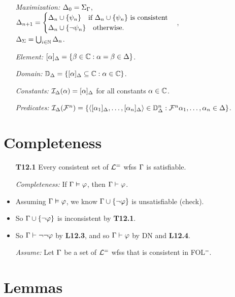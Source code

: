 \documentclass[a4paper, 11pt]{article} %
\begin{document}
\begin{itemize}
  \item[\it Maximization:]
    $\Delta_0 = \Sigma_{\Gamma}$,\\ 
    $\Delta_{n+1} =
      \begin{cases}
        \Delta_n\cup\lbrace\psi_n\rbrace ~~\text{ if } \Delta_n\cup\lbrace\psi_n\rbrace \text{ is consistent}\\
        \Delta_n\cup\lbrace\neg\psi_n\rbrace ~~\text{ otherwise}.
      \end{cases}$,\\
    $\Delta_{\Sigma} = \bigcup_{i\in\mathbb{N}}\Delta_n$. 
  \item[\it Element:] $[\alpha]_{\Delta}=\lbrace\beta\in\mathbb{C} : \alpha=\beta\in\Delta\rbrace$.
  \item[\it Domain:] $\mathbb{D}_{\Delta}=\lbrace[\alpha]_{\Delta} \subseteq \mathbb{C} : \alpha\in\mathbb{C}\rbrace$.
  \item[\it Constants:] $\mathcal{I}_{\Delta}(\alpha)=[\alpha]_{\Delta}$ for all constants $\alpha\in\mathbb{C}$.
  \item[\it Predicates:] $\mathcal{I}_{\Delta}(\mathcal{F}^n)=\lbrace\langle[\alpha_1]_{\Delta},\ldots,[\alpha_n]_{\Delta}\rangle\in\mathbb{D}_{\Delta}^n:\mathcal{F}^n\alpha_1,\ldots,\alpha_n\in\Delta\rbrace$.
\end{itemize}




\section*{Completeness}

\begin{itemize}
  \item[\bf T12.1] Every consistent set of $\mathcal{L}^=$ wfss $\Gamma$ is satisfiable.
  \item[\it Completeness:] If $\Gamma\vDash\varphi$, then $\Gamma\vdash\varphi$.
  \item Assuming $\Gamma\vDash\varphi$, we know $\Gamma\cup\lbrace\neg\varphi\rbrace$ is unsatisfiable (check).
  \item So $\Gamma\cup\lbrace\neg\varphi\rbrace$ is inconsistent by \textbf{T12.1}.
  \item So $\Gamma\vdash\neg\neg\varphi$ by \textbf{L12.3}, and so $\Gamma\vdash\varphi$ by DN and \textbf{L12.4}.
  \item[\it Assume:] Let $\Gamma$ be a set of $\mathcal{L}^=$ wfss that is consistent in FOL$^=$.
\end{itemize}







\section*{Lemmas}
\end{document}
